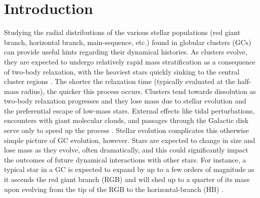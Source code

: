 

\thispagestyle{fancy}
%
%
%
\section{Introduction} \label{intro3}

Studying the radial distributions of the various stellar 
populations (red giant branch, horizontal branch, main-sequence,
etc.) found in globular clusters (GCs) can provide useful hints 
regarding their dynamical histories.  As clusters evolve, they are
expected to undergo relatively rapid mass stratification as a
consequence of two-body relaxation, with the heaviest stars quickly
sinking to the central cluster regions
\citep{spitzer87}.  The shorter the relaxation time (typically
evaluated at the half-mass radius), the quicker this process occurs.  
Clusters tend towards dissolution as two-body
relaxation progresses and they lose mass due to stellar evolution and
the preferential escape of low-mass stars.  External effects like
tidal perturbations, encounters with giant molecular clouds, and
passages through the Galactic disk serve only to speed up the process
\citep[e.g.][]{baumgardt03, kupper08}.  Stellar evolution complicates
this otherwise simple picture of GC evolution, however.  Stars are
expected to change in size and lose mass as they evolve, often
dramatically, and this could significantly impact the outcomes of
future dynamical interactions with other stars.  For instance, a
typical star in a GC is expected to expand by up to a few orders of
magnitude as it ascends the red giant branch (RGB) and will shed up to
a quarter of its mass upon evolving from the tip of the RGB to the 
horizontal-branch (HB) \citep[e.g.][]{caloi08, lee94}.  


